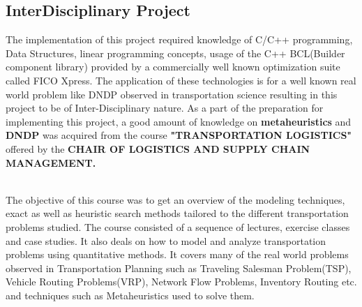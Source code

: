 \documentclass[a4paper, 12pt]{article}
\begin{document}
\subsection{InterDisciplinary Project}
The implementation of this project required knowledge of C/C++ programming, Data Structures, linear programming concepts, usage of the C++ BCL(Builder component library) provided by a commercially well known optimization suite called FICO Xpress. The application of these technologies is for a well known real world problem like DNDP observed in transportation science resulting in this project to be of Inter-Disciplinary nature. As a part of the preparation for implementing this project, a good amount of knowledge on \textbf{metaheuristics} and \textbf{DNDP} was acquired from the course \textbf{"TRANSPORTATION LOGISTICS"} offered by the \textbf{CHAIR OF LOGISTICS AND SUPPLY CHAIN MANAGEMENT.}\par
\noindent
\\
The objective of this course was to get an overview of the modeling techniques, exact as well as heuristic search methods tailored to the different transportation problems studied. The course consisted of a sequence of lectures, exercise classes and case studies. It also deals on how to model and analyze transportation problems using quantitative methods. It covers many of the real world problems observed in Transportation Planning such as Traveling Salesman Problem(TSP), Vehicle Routing Problems(VRP), Network Flow Problems, Inventory Routing etc. and techniques such as Metaheuristics used to solve them.\par
\end{document}
